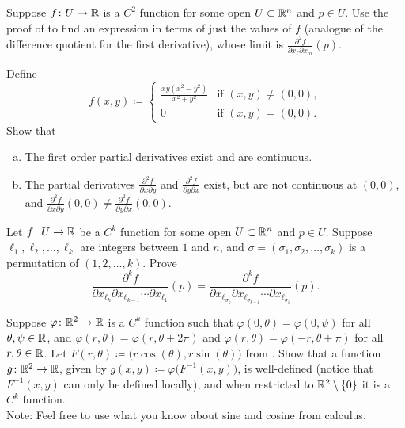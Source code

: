 \begin{exercise}
Suppose $f \colon U \to {\mathbb{R}}$ is a $C^2$ function for some open $U \subset
{\mathbb{R}}^n$ and $p \in U$.
Use the proof of  to find an expression
in terms of just the values of $f$ (analogue of the difference quotient
for the first derivative), whose limit is
$\frac{\partial^2 f}{ \partial x_{\ell} \partial x_m}(p)$.
\end{exercise}

\begin{exercise} \label{exercise:mixedpartialsunequal}
Define
\begin{equation*}
f(x,y) \coloneqq
\begin{cases}
\frac{xy(x^2-y^2)}{x^2+y^2} & \text{if } (x,y) \neq (0,0),\\
0                           & \text{if } (x,y) = (0,0).
\end{cases}
\end{equation*}
Show that
\begin{enumerate}[a)]
\item
The first order partial derivatives exist and are continuous.
\item
The partial derivatives
$\frac{\partial^2 f}{\partial x \partial y}$ and
$\frac{\partial^2 f}{\partial y \partial x}$ exist, but are not continuous
at $(0,0)$, and
$\frac{\partial^2 f}{\partial x \partial y}(0,0) \neq 
\frac{\partial^2 f}{\partial y \partial x}(0,0)$.
\end{enumerate}
\end{exercise}

\begin{exercise}
Let $f \colon U \to {\mathbb{R}}$ be a $C^k$ function for some open $U \subset {\mathbb{R}}^n$
and $p \in U$.
Suppose ${\ell}_1,{\ell}_2,\ldots,{\ell}_k$ are integers between $1$
and $n$, and $\sigma=(\sigma_1,\sigma_2,\ldots,\sigma_k)$ is a
permutation of $(1,2,\ldots,k)$.  Prove
\begin{equation*}
\frac{\partial^{k} f}{\partial x_{{\ell}_{k}} \partial x_{{\ell}_{k-1}}
\cdots \partial x_{{\ell}_1}} (p)
=
\frac{\partial^{k} f}{\partial x_{{\ell}_{\sigma_k}} \partial
x_{{\ell}_{\sigma_{k-1}}}
\cdots \partial x_{{\ell}_{\sigma_1}}} (p) .
\end{equation*}
\end{exercise}

\begin{exercise}
Suppose $\varphi \colon {\mathbb{R}}^2 \to {\mathbb{R}}$ is a $C^k$ function
such that
$\varphi(0,\theta) = \varphi(0,\psi)$ for all $\theta,\psi \in {\mathbb{R}}$,
and
$\varphi(r,\theta) = \varphi(r,\theta+2\pi)$
and
$\varphi(r,\theta) = \varphi(-r,\theta+\pi)$
for all $r,\theta \in {\mathbb{R}}$.
Let $F(r,\theta) \coloneqq \bigl(r \cos(\theta), r \sin(\theta) \bigr)$ from 
.  Show that a function
$g \colon {\mathbb{R}}^2 \to {\mathbb{R}}$, given by
$g(x,y) \coloneqq \varphi \bigl(F^{-1}(x,y)\bigr)$, is well-defined (notice that
$F^{-1}(x,y)$ can only be defined locally), and
when restricted to ${\mathbb{R}}^2 \setminus \{ 0 \}$ it is a $C^k$ function.
\\
Note: Feel free to use what you know about sine and cosine from calculus.
\end{exercise}

